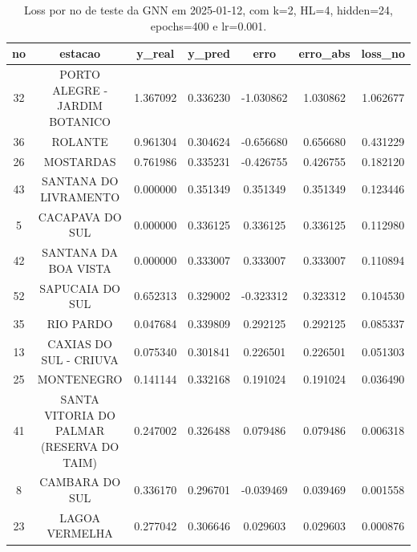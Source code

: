 \begin{table}[h]
\centering
\caption{Loss por no de teste da GNN em 2025-01-12, com k=2, HL=4, hidden=24, epochs=400 e lr=0.001.}
\label{tab:gnn_loss_k2_hl4_h24_e400_d20250112}
\begin{tabular}{ccccccc}
\toprule
no & estacao & y\_real & y\_pred & erro & erro\_abs & loss\_no \\
\midrule
32 & PORTO ALEGRE - JARDIM BOTANICO & 1.367092 & 0.336230 & -1.030862 & 1.030862 & 1.062677 \\
36 & ROLANTE & 0.961304 & 0.304624 & -0.656680 & 0.656680 & 0.431229 \\
26 & MOSTARDAS & 0.761986 & 0.335231 & -0.426755 & 0.426755 & 0.182120 \\
43 & SANTANA DO LIVRAMENTO & 0.000000 & 0.351349 & 0.351349 & 0.351349 & 0.123446 \\
5 & CACAPAVA DO SUL & 0.000000 & 0.336125 & 0.336125 & 0.336125 & 0.112980 \\
42 & SANTANA DA BOA VISTA & 0.000000 & 0.333007 & 0.333007 & 0.333007 & 0.110894 \\
52 & SAPUCAIA DO SUL & 0.652313 & 0.329002 & -0.323312 & 0.323312 & 0.104530 \\
35 & RIO PARDO & 0.047684 & 0.339809 & 0.292125 & 0.292125 & 0.085337 \\
13 & CAXIAS DO SUL - CRIUVA & 0.075340 & 0.301841 & 0.226501 & 0.226501 & 0.051303 \\
25 & MONTENEGRO & 0.141144 & 0.332168 & 0.191024 & 0.191024 & 0.036490 \\
41 & SANTA VITORIA DO PALMAR (RESERVA DO TAIM) & 0.247002 & 0.326488 & 0.079486 & 0.079486 & 0.006318 \\
8 & CAMBARA DO SUL & 0.336170 & 0.296701 & -0.039469 & 0.039469 & 0.001558 \\
23 & LAGOA VERMELHA & 0.277042 & 0.306646 & 0.029603 & 0.029603 & 0.000876 \\
\bottomrule
\end{tabular}
\end{table}
